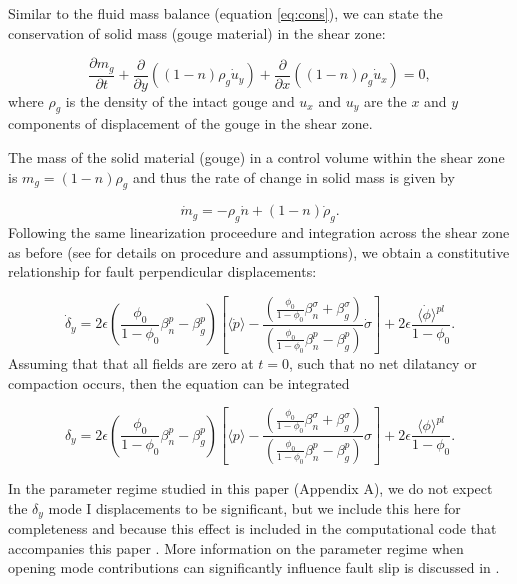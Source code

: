 \documentclass[draft]{agujournal2019}
\begin{document}
Similar to the fluid mass balance (equation \ref{eq:cons}), we can state the conservation of solid mass (gouge material) in the shear zone:

\begin{equation}
    \frac{\partial m_g}{\partial t} + \frac{\partial}{\partial y} \left(  (1 - n) \rho_g \dot{u}_y \right) +  \frac{\partial}{\partial x} \left(  (1 - n) \rho_g \dot{u}_x \right) = 0,
    \label{eq:conssolid}
\end{equation}
where $\rho_g$ is the density of the intact gouge and $u_x$ and $u_y$ are the $x$ and $y$ components of displacement of the gouge in the shear zone.

The mass of the solid material (gouge) in a control volume within the shear zone is $m_g = (1-n)\rho_g$ and thus the rate of change in solid mass is given by

\begin{equation}
    \dot{m}_g =  - \rho_g \dot{n} + (1-n) \dot{\rho}_g.
\end{equation}
Following the same linearization proceedure and integration across the shear zone as before (see  for details on procedure and assumptions), we obtain a constitutive relationship for fault perpendicular displacements:

\begin{equation}
     \dot{\delta}_y =  2 \epsilon \left( \frac{ \phi_0 }{1 - \phi_0} \beta_n^p - \beta_g^p \right) \left[  \langle \dot{p} \rangle  - \frac{ \left( \frac{ \phi_0 }{1 - \phi_0} \beta_n^{\sigma}  +    \beta_g^\sigma \right)}{\left( \frac{ \phi_0 }{1 - \phi_0} \beta_n^p - \beta_g^p \right)} \dot{\sigma}  \right] + 2 \epsilon \frac{ \langle \dot{\phi} \rangle^{pl}}{1 - \phi_0}.
\end{equation}
Assuming that that all fields are zero at $t=0$, such that no net dilatancy or compaction occurs, then the equation can be integrated

\begin{equation}
     {\delta}_y =  2 \epsilon \left( \frac{ \phi_0 }{1 - \phi_0} \beta_n^p - \beta_g^p \right) \left[  \langle {p} \rangle  - \frac{ \left( \frac{ \phi_0 }{1 - \phi_0} \beta_n^{\sigma}  +    \beta_g^\sigma \right)}{\left( \frac{ \phi_0 }{1 - \phi_0} \beta_n^p - \beta_g^p \right)} {\sigma}  \right] + 2 \epsilon \frac{ \langle {\phi} \rangle^{pl}}{1 - \phi_0}.
     \label{eq:dy}
\end{equation}

In the parameter regime studied in this paper (Appendix A), we do not expect the $\delta_y$ mode I displacements to be significant, but we include this here for completeness and because this effect is included in the computational code that accompanies this paper \cite{elias_rafn_heimisson_Poro_SBIM}. More information on the parameter regime when opening mode contributions can significantly influence fault slip is discussed in .
\end{document}
